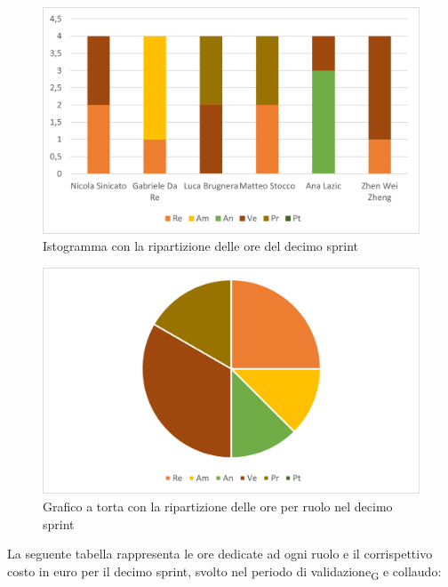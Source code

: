 \begin{figure}[H]
    \centering
    \includegraphics[scale=0.6]{img/grafi preventivo/istogrammi/validazione/periodo2.png}
    \caption{Istogramma con la ripartizione delle ore del decimo sprint}
\end{figure}
\begin{figure}[H]
    \centering
    \includegraphics[scale=0.6]{img/grafi preventivo/torta/validazione/periodo2.png}
    \caption{Grafico a torta con la ripartizione delle ore per ruolo nel decimo sprint}
\end{figure}
La seguente tabella rappresenta le ore dedicate ad ogni ruolo e il corrispettivo costo in euro per il decimo sprint, svolto nel periodo di validazione\textsubscript{G} e collaudo:

